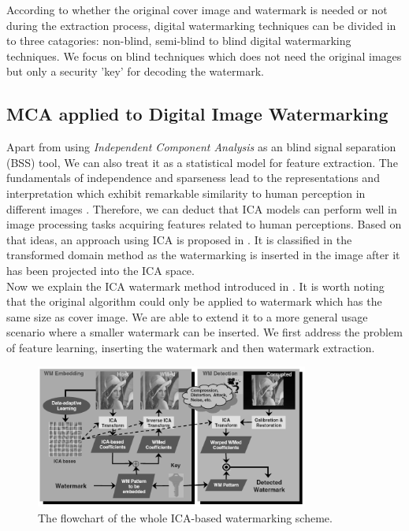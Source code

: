 According to whether the original cover image and watermark is needed or not during the extraction process, digital watermarking techniques can be divided in to three catagories: non-blind, semi-blind to blind digital watermarking techniques\cite{Yu2017}. We focus on blind techniques which does not need the original images but only a security 'key' for decoding the watermark.\\

\subsection{MCA applied to Digital Image Watermarking}
Apart from using \textit{Independent Component Analysis} as an blind signal separation (BSS) tool, We can also treat it as a statistical model for feature extraction. The fundamentals of independence and sparseness lead to the representations and interpretation which exhibit remarkable similarity to human perception in different images \cite{BELL19973327}. Therefore, we can deduct that ICA
models can perform well in image processing tasks acquiring features related to human perceptions. Based on that ideas, an approach using ICA is proposed in \cite{inproceedingsICA_watermark}. It is classified in the transformed domain method as the watermarking is inserted in the image after it has been projected into the ICA space. \\

Now we explain the ICA watermark method introduced in \cite{inproceedingsICA_watermark}. It is worth noting that the original algorithm could only be applied to watermark which has the same size as cover image. We are able to extend it to a more general usage scenario where a smaller watermark can be inserted. We first address the problem of feature learning, inserting the watermark and then watermark extraction.

\begin{figure}[H]
\centering
\includegraphics[width=0.8\textwidth]{images/ICA_flowchart_gray.png}
\caption{The flowchart of the whole ICA-based watermarking scheme. \cite{LuWei_ICA}}
\label{flow_ICA}
\end{figure}

